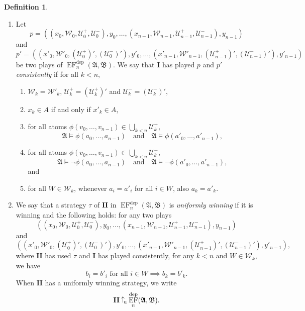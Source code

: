 \documentclass[12pt]{article}
\theoremstyle{definition}
\newtheorem{definition}{Definition}[section]
\newcommand{\wins}{\mathbin{\raisebox{0.8\depth}{$\uparrow$}}}
\newcommand{\playerone}{\mathrm{\mathbf{I}}}
\newcommand{\playertwo}{\mathrm{\mathbf{II}}}
\DeclareMathOperator{\EF}{EF}
\newcommand{\EFdep}{\EF^{\mathrm{dep}}}
\newcommand{\winsu}{\wins_{\!\textrm u}}
\newcommand{\W}{\mathcal W}
\newcommand{\U}{\mathcal U}
\newcommand{\A}{\mathfrak{A}}
\newcommand{\B}{\mathfrak{B}}
\begin{document}
\begin{definition}\label{Uniform winning strategy}\quad
    \begin{enumerate}
        \item Let
        \[
            p = ((x_0,\W_0,\U^+_0,\U^-_0),y_0,\dots,(x_{n-1},\W_{n-1},\U^+_{n-1},\U^-_{n-1}),y_{n-1})
        \]
        and
        \[
            p' = ((x'_0,\W'_0,(\U^+_0)',(\U^-_0)'),y'_0,\dots,(x'_{n-1},\W'_{n-1},(\U^+_{n-1})',(\U^-_{n-1})'),y'_{n-1})
        \]
        be two plays of $\EFdep_n(\A,\B)$. We say that $\playerone$ has played $p$ and $p'$ \emph{consistently} if for all $k<n$,
        \begin{enumerate}
            \item $\W_k = \W'_k$, $\U^+_k = (\U^+_k)'$ and $\U^-_k = (\U^-_k)'$,
            \item $x_k\in A$ if and only if $x'_k\in A$,
            \item for all atoms $\phi(v_0,\dots,v_{n-1})\in\bigcup_{k<n}\U^+_k$,
            \[
                \A\models\phi(a_0,\dots,a_{n-1}) \quad\text{and}\quad \A\models\phi(a'_0,\dots,a'_{n-1}),
            \]
            \item for all atoms $\phi(v_0,\dots,v_{n-1})\in\bigcup_{k<n}\U^-_k$,
            \[
                \A\models\neg\phi(a_0,\dots,a_{n-1}) \quad\text{and}\quad \A\models\neg\phi(a'_0,\dots,a'_{n-1}),
            \]
            and
            \item for all $W\in\W_k$, whenever $a_i = a'_i$ for all $i\in W$, also $a_k = a'_k$.
        \end{enumerate}
        \item We say that a strategy $\tau$ of $\playertwo$ in $\EFdep_n(\A,\B)$ is \emph{uniformly winning} if it is winning and the following holds: for any two plays
        \[
            ((x_0,\W_0,\U^+_0,\U^-_0),y_0,\dots,(x_{n-1},\W_{n-1},\U^+_{n-1},\U^-_{n-1}),y_{n-1})
        \]
        and
        \[
            ((x'_0,\W'_0,(\U^+_0)',(\U^-_0)'),y'_0,\dots,(x'_{n-1},\W'_{n-1},(\U^+_{n-1})',(\U^-_{n-1})'),y'_{n-1}),
        \]
        where $\playertwo$ has used $\tau$ and $\playerone$ has played consistently, for any $k<n$ and $W\in\W_k$, we have
        \[
            \text{$b_i = b'_i$ for all $i\in W$} \implies b_k = b'_k.
        \]
        When $\playertwo$ has a uniformly winning strategy, we write
        \[
            \playertwo\winsu\EFdep_n(\A,\B).
        \]
    \end{enumerate}
\end{definition}
\end{document}
